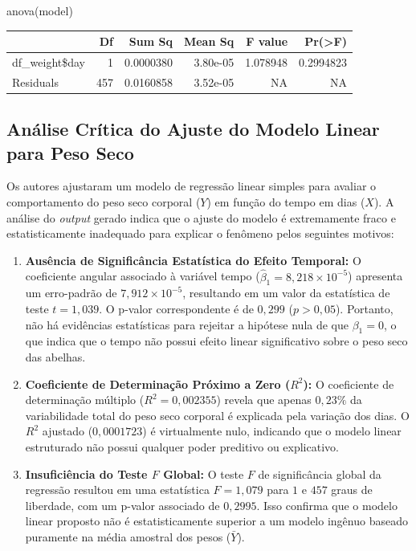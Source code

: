 \documentclass[
  brazilian,
  12pt,
  a4paper,
]{article}
\newenvironment{Shaded}{\begin{snugshade}}{\end{snugshade}}
\newcommand{\FunctionTok}[1]{\textcolor[rgb]{0.28,0.35,0.67}{#1}}
\newcommand{\NormalTok}[1]{\textcolor[rgb]{0.00,0.46,0.62}{#1}}
\begin{document}
\begin{Shaded}
\begin{Highlighting}[]
\FunctionTok{anova}\NormalTok{(model)}
\end{Highlighting}
\end{Shaded}

\begin{longtable}[]{@{}lrrrrr@{}}
\toprule\noalign{}
& Df & Sum Sq & Mean Sq & F value & Pr(\textgreater F) \\
\midrule\noalign{}
\endhead
\bottomrule\noalign{}
\endlastfoot
df\_weight\$day & 1 & 0.0000380 & 3.80e-05 & 1.078948 & 0.2994823 \\
Residuals & 457 & 0.0160858 & 3.52e-05 & NA & NA \\
\end{longtable}

\subsection{Análise Crítica do Ajuste do Modelo Linear para Peso Seco}

Os autores ajustaram um modelo de regressão linear simples para avaliar
o comportamento do peso seco corporal (\(Y\)) em função do tempo em dias
(\(X\)). A análise do \textit{output} gerado indica que o ajuste do
modelo é extremamente fraco e estatisticamente inadequado para explicar
o fenômeno pelos seguintes motivos:

\begin{enumerate}
    \item \textbf{Ausência de Significância Estatística do Efeito Temporal:}
    O coeficiente angular associado à variável tempo ($\hat{\beta}_1 = 8,218 \times 10^{-5}$) apresenta um erro-padrão de $7,912 \times 10^{-5}$, resultando em um valor da estatística de teste $t = 1,039$. O p-valor correspondente é de $0,299$ ($p > 0,05$). Portanto, não há evidências estatísticas para rejeitar a hipótese nula de que $\beta_1 = 0$, o que indica que o tempo não possui efeito linear significativo sobre o peso seco das abelhas.
    
    \item \textbf{Coeficiente de Determinação Próximo a Zero ($R^2$):}
    O coeficiente de determinação múltiplo ($R^2 = 0,002355$) revela que apenas $0,23\%$ da variabilidade total do peso seco corporal é explicada pela variação dos dias. O $R^2$ ajustado ($0,0001723$) é virtualmente nulo, indicando que o modelo linear estruturado não possui qualquer poder preditivo ou explicativo.
    
    \item \textbf{Insuficiência do Teste $F$ Global:}
    O teste $F$ de significância global da regressão resultou em uma estatística $F = 1,079$ para $1$ e $457$ graus de liberdade, com um p-valor associado de $0,2995$. Isso confirma que o modelo linear proposto não é estatisticamente superior a um modelo ingênuo baseado puramente na média amostral dos pesos ($\bar{Y}$).
\end{enumerate}
\end{document}
